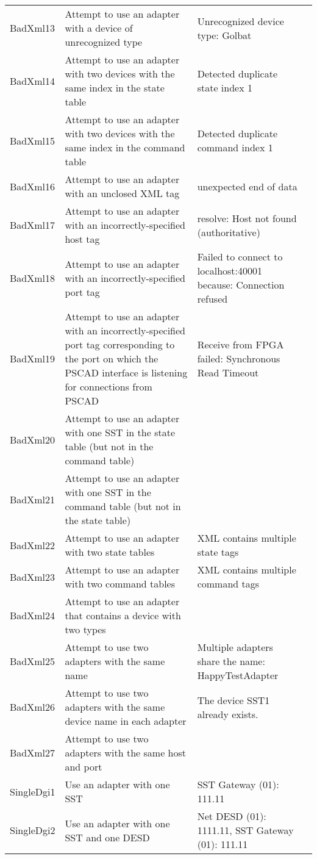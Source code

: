 \documentclass{article}
\begin{document}
\begin{center}
\begin{footnotesize}
\begin{longtable}{|p{3cm}|p{4cm}|p{10cm}|c|}
    BadXml13 & Attempt to use an adapter with a device of unrecognized type & Unrecognized device type: Golbat & \\
    BadXml14 & Attempt to use an adapter with two devices with the same index in the state table & Detected duplicate state index 1 & \\
    BadXml15 & Attempt to use an adapter with two devices with the same index in the command table & Detected duplicate command index 1 & \\
    BadXml16 & Attempt to use an adapter with an unclosed XML tag & unexpected end of data & \\
    BadXml17 & Attempt to use an adapter with an incorrectly-specified host tag & resolve: Host not found (authoritative) & \\
    BadXml18 & Attempt to use an adapter with an incorrectly-specified port tag & Failed to connect to localhost:40001 because: Connection refused & \\
    BadXml19 & Attempt to use an adapter with an incorrectly-specified port tag corresponding to the port on which the PSCAD interface is listening for connections from PSCAD & Receive from FPGA failed: Synchronous Read Timeout & \\
    BadXml20 & Attempt to use an adapter with one SST in the state table (but not in the command table) & & \\
    BadXml21 & Attempt to use an adapter with one SST in the command table (but not in the state table) & & \\
    BadXml22 & Attempt to use an adapter with two state tables & XML contains multiple state tags & \\
    BadXml23 & Attempt to use an adapter with two command tables & XML contains multiple command tags & \\
    BadXml24 & Attempt to use an adapter that contains a device with two types & \\
    BadXml25 & Attempt to use two adapters with the same name & Multiple adapters share the name: HappyTestAdapter & \\
    BadXml26 & Attempt to use two adapters with the same device name in each adapter & The device SST1 already exists. & \\
    BadXml27 & Attempt to use two adapters with the same host and port & & \\
    SingleDgi1 & Use an adapter with one SST & SST Gateway (01): 111.11 & \\
    SingleDgi2 & Use an adapter with one SST and one DESD & Net DESD (01): 1111.11, SST Gateway (01): 111.11 & \\

\end{longtable}
\end{footnotesize}
\end{center}
\end{document}

